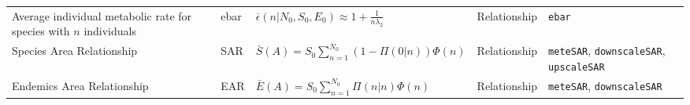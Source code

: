 \begin{table}[!h]
\begin{tabular}{L{4cm} p{1.2cm} L{5.4cm} p{2cm} p{2cm}}
	Average individual metabolic rate for species with $n$ individuals & ebar & $\overline{\epsilon}(n | N_0, S_0,E_0) \approx 1 + \frac{1}{n\lambda_2}$ & Relationship & \texttt{ebar} \\
	Species Area Relationship & SAR & $\bar{S}(A) = S_0 \sum_{n=1}^{N_0} \left(1 - \Pi(0 | n)\right) \Phi(n)$ & Relationship & \texttt{meteSAR}, \verb|downscaleSAR|, \verb|upscaleSAR| \\
	Endemics Area Relationship & EAR & $\bar{E}(A) = S_0 \sum_{n=1}^{N_0} \Pi(n | n) \Phi(n)$ & Relationship & \verb|meteSAR|, \verb|downscaleSAR| \\
   \hline
\end{tabular}
\end{table}

